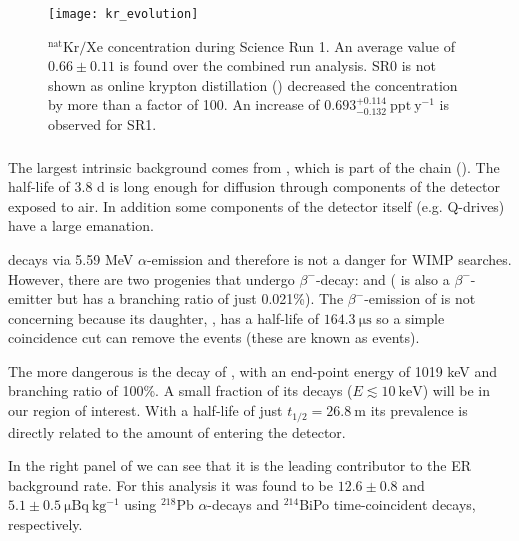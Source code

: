 \begin{figure}
\centering
\texttt{[image: kr\_evolution]}
\caption{$\mathrm{^{nat}Kr / Xe}$ concentration during Science Run 1.  An average value of $0.66 \pm 0.11$ is found over the combined
run analysis.  SR0 is not shown as online krypton distillation () decreased the concentration by more than
a factor of 100.  An increase of $0.693_{-0.132}^{+0.114}\ \mathrm{ppt\ y^{-1}}$ is observed for SR1.}
\label{fig:backgrounds_electronic_krypton_rate_increase}
\end{figure}

\subsubsection{}
\label{subsubsec:backgrounds_electronic_radon}
The largest intrinsic background comes from , which is part of the  chain
().  The half-life of 3.8 d is long enough for diffusion through components of the detector exposed
to air.  In addition some components of the detector itself (e.g. Q-drives) have a large  emanation.

decays via 5.59 MeV $\alpha$-emission and therefore is not a danger for WIMP searches.  However, there are two progenies that undergo
$\beta^-$-decay:  and  ( is also a $\beta^-$-emitter but has a branching ratio of just
0.021\%).  The $\beta^-$-emission of  is not concerning because its daughter, , has a half-life of
$164.3\ \mathrm{\mu s}$ so a simple coincidence cut can remove the events (these are known as  events).

The more dangerous is the decay of , with an end-point energy of 1019 keV and branching ratio of 100\%.  A small fraction of
its decays ($E \lesssim 10\ \mathrm{keV}$) will be in our region of interest.  With a half-life of just $t_{1/2} = 26.8\ \mathrm{m}$ its
prevalence is directly related to the amount of  entering the detector.

In the right panel of  we can see that it is the leading contributor to
the ER background rate.  For this analysis it was found to be $12.6 \pm 0.8$ and $5.1 \pm 0.5\ \mathrm{\mu Bq\ kg^{-1}}$ using $^{218}$Pb
$\alpha$-decays and $^{214}$BiPo time-coincident decays, respectively.

